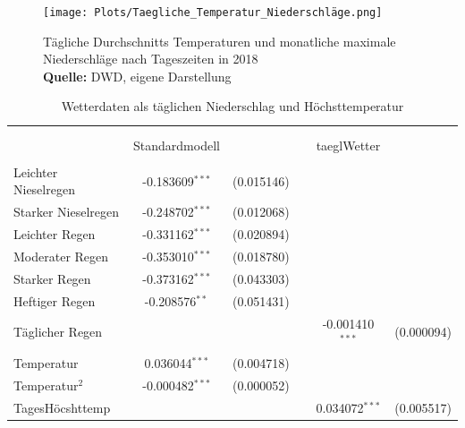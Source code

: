 \documentclass[a4paper,12pt]{thesis}
\newcommand*{\captionsource}[2]{%
	\caption[{#1}]{%
		#1%
		\\\hspace{\linewidth}%
		\textbf{Quelle:} #2%
	}%
}
\begin{document}
\begin{figure}[!ht]
	\centering
	\texttt{[image: Plots/Taegliche\_Temperatur\_Niederschläge.png]}
	\captionsource{Tägliche Durchschnitts Temperaturen und monatliche maximale Niederschläge nach Tageszeiten in 2018}{
		DWD, eigene Darstellung
	}
	\label{fig:meine-grafik5}
\end{figure}






\begin{table}[!htbp] \centering 
	\caption{Wetterdaten als täglichen Niederschlag und Höchsttemperatur} 
	\label{ExtraWetter} 
	\begin{tabular}{@{\extracolsep{-5pt}}lccccc} 
		\\[-1.8ex]\hline 
		\hline \\[-1.8ex] 
		\\[-1.8ex] & Standardmodell & & & taeglWetter & \\ 
		\hline \\[-1.8ex] 
		
		Leichter Nieselregen & -0.183609$^{***}$ & (0.015146) &  &  & \\ 
		
		Starker Nieselregen & -0.248702$^{***}$ & (0.012068) &  &  & \\ 
		
		Leichter Regen & -0.331162$^{***}$ & (0.020894) &  &  & \\ 
		
		Moderater Regen & -0.353010$^{***}$ & (0.018780) &  &  & \\ 
		
		Starker Regen & -0.373162$^{***}$ & (0.043303) &  &  & \\ 
		
		Heftiger Regen & -0.208576$^{**}$ & (0.051431) &  &  & \\ 
		
		Täglicher Regen &  &  &  & -0.001410$^{***}$ & (0.000094)\\ 
		
		Temperatur & 0.036044$^{***}$ & (0.004718) & & \\ 
		
		Temperatur$^2$ & -0.000482$^{***}$ & (0.000052) &  &  & \\ 
		
		TagesHöcshttemp & &  &  & 0.034072$^{***}$ & (0.005517)\\ 
		

\end{tabular}
\end{table}
\end{document}
